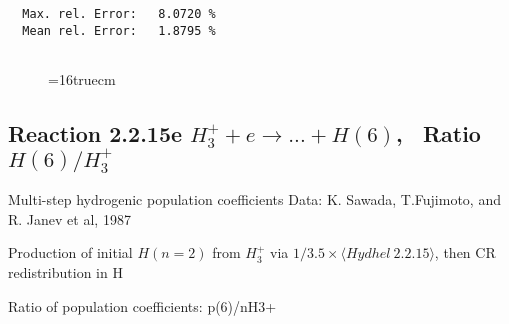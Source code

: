 \documentclass[12pt,dvipdfmx]{article}
\begin{document}
\begin{small}
\begin{verbatim}
  Max. rel. Error:   8.0720 %
  Mean rel. Error:   1.8795 %


\end{verbatim}\end{small}
\begin{figure} \label{2.2.15d}
\epsfxsize=16truecm
\end{figure}
\newpage
\subsection{
Reaction 2.2.15e $ H_3^+ + e \rightarrow ...+ H(6) $, \   Ratio $H(6)/H_3^+  $
}

 Multi-step hydrogenic population coefficients
 Data: K. Sawada, T.Fujimoto, \cite{kn:Sawada} and R. Janev et al, 1987

 Production of initial $H(n=2)$ from $H_3^+$ via $1/3.5 \times \langle Hydhel~ 2.2.15\rangle$,
 then CR redistribution in H

 Ratio of population coefficients: p(6)/nH3+
\end{document}
